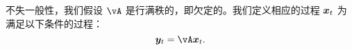 \documentclass[../../book-main_zh.tex]{subfiles}
\begin{document}


不失一般性，我们假设 $\vA$ 是行满秩的，即欠定的。我们定义相应的过程 $\bm{x}_t$ 为满足以下条件的过程：
\begin{equation}
\y_t = \vA \x_t.   
\end{equation}
\end{document}
